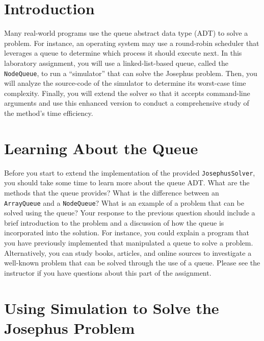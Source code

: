


\usepackage[compact]{titlesec}


\section*{Introduction}

  Many real-world programs use the queue abstract data type (ADT) to solve a problem.  For instance, an operating system
  may use a round-robin scheduler that leverages a queue to determine which process it should execute next. In this
  laboratory assignment, you will use a linked-list-based queue, called the {\tt NodeQueue}, to run a ``simulator'' that
  can solve the Josephus problem. Then, you will analyze the source-code of the simulator to determine its worst-case
  time complexity.  Finally, you will extend the solver so that it accepts command-line arguments and use this enhanced
  version to conduct a comprehensive study of the method's time efficiency.

\section*{Learning About the Queue}

  Before you start to extend the implementation of the provided {\tt JosephusSolver}, you should take some time to learn
  more about the queue ADT.  What are the methods that the queue provides?  What is the difference between an {\tt
    ArrayQueue} and a {\tt NodeQueue}? What is an example of a problem that can be solved using the queue? Your response
  to the previous question should include a brief introduction to the problem and a discussion of how the queue is
  incorporated into the solution. For instance, you could explain a program that you have previously implemented that
  manipulated a queue to solve a problem.  Alternatively, you can study books, articles, and online sources to
  investigate a well-known problem that can be solved through the use of a queue.  Please see the instructor if you have
  questions about this part of the assignment.

\section*{Using Simulation to Solve the Josephus Problem}

